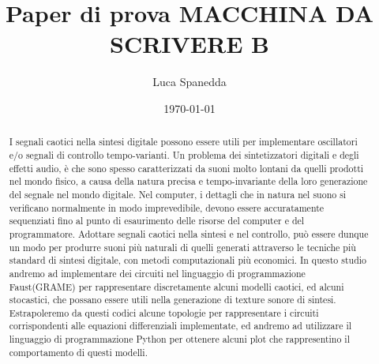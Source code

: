 \documentclass{article}
\begin{document}
\title{Paper di prova MACCHINA DA SCRIVERE B}
\author{Luca Spanedda}
\date{\today}
\maketitle

\begin{abstract}
I segnali caotici nella sintesi digitale possono essere utili per implementare  
oscillatori e/o segnali di controllo tempo-varianti.
Un problema dei sintetizzatori digitali e degli effetti audio,
è che sono spesso caratterizzati da suoni molto lontani da quelli prodotti nel mondo fisico,
a causa della natura precisa e tempo-invariante della loro generazione del segnale nel mondo digitale.
\newline
Nel computer, i dettagli che in natura nel suono si verificano normalmente in modo imprevedibile, 
devono essere accuratamente sequenziati fino al punto di esaurimento 
delle risorse del computer e del programmatore.
\newline
Adottare segnali caotici nella sintesi e nel controllo, può essere dunque un modo
per produrre suoni più naturali di quelli generati attraverso le tecniche più standard di sintesi digitale,
con metodi computazionali più economici.
\newline
In questo studio andremo ad implementare dei circuiti nel linguaggio di programmazione Faust(GRAME)
per rappresentare discretamente alcuni modelli caotici, ed alcuni stocastici,
che possano essere utili nella generazione di texture sonore di sintesi.
Estrapoleremo da questi codici alcune topologie per rappresentare i circuiti corrispondenti
alle equazioni differenziali implementate, ed andremo ad utilizzare il linguaggio di programmazione 
Python per ottenere alcuni plot che rappresentino il comportamento di questi modelli.
\end{abstract}

\pagebreak
\lipsum[1-3]
\end{document}
